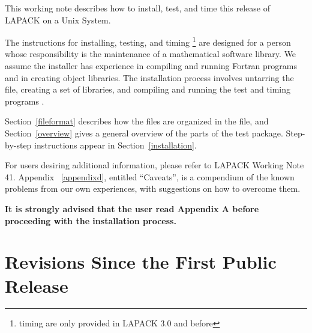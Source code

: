 \documentclass[11pt]{report}
\begin{document}
This working note describes how to install, test, and time this
release of LAPACK on a Unix System.

The instructions for installing, testing, and timing
\footnote{timing are only provided in LAPACK 3.0 and before}
are designed for a person whose
responsibility is the maintenance of a mathematical software library.
We assume the installer has experience in compiling and running
Fortran programs and in creating object libraries.
The installation process involves untarring the file, creating a set of
libraries, and compiling and running the test and timing programs
\footnotemark[\value{footnote}].


Section~\ref{fileformat} describes how the files are organized in the
file, and
Section~\ref{overview} gives a general overview of the parts of the test package.
Step-by-step instructions appear in Section~\ref{installation}.

For users desiring additional information, please refer to LAPACK
Working Note 41.
Appendix ~\ref{appendixd}, entitled ``Caveats'', is a compendium of the known
problems from our own experiences, with suggestions on how to
overcome them.

\textbf{It is strongly advised that the user read Appendix
A before proceeding with the installation process.}

\section{Revisions Since the First Public Release}
\end{document}
